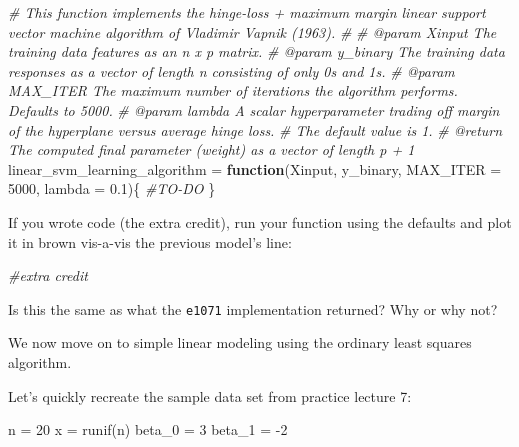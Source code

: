 \documentclass[
]{article}
\newenvironment{Shaded}{\begin{snugshade}}{\end{snugshade}}
\newcommand{\AttributeTok}[1]{\textcolor[rgb]{0.77,0.63,0.00}{#1}}
\newcommand{\CommentTok}[1]{\textcolor[rgb]{0.56,0.35,0.01}{\textit{#1}}}
\newcommand{\ControlFlowTok}[1]{\textcolor[rgb]{0.13,0.29,0.53}{\textbf{#1}}}
\newcommand{\DecValTok}[1]{\textcolor[rgb]{0.00,0.00,0.81}{#1}}
\newcommand{\FloatTok}[1]{\textcolor[rgb]{0.00,0.00,0.81}{#1}}
\newcommand{\FunctionTok}[1]{\textcolor[rgb]{0.00,0.00,0.00}{#1}}
\newcommand{\NormalTok}[1]{#1}
\newcommand{\OtherTok}[1]{\textcolor[rgb]{0.56,0.35,0.01}{#1}}
\newcommand{\SpecialCharTok}[1]{\textcolor[rgb]{0.00,0.00,0.00}{#1}}
\begin{document}
\begin{Shaded}
\begin{Highlighting}[]
\CommentTok{\#\textquotesingle{} This function implements the hinge{-}loss + maximum margin linear support vector machine algorithm of Vladimir Vapnik (1963).}
\CommentTok{\#\textquotesingle{}}
\CommentTok{\#\textquotesingle{} @param Xinput      The training data features as an n x p matrix.}
\CommentTok{\#\textquotesingle{} @param y\_binary    The training data responses as a vector of length n consisting of only 0\textquotesingle{}s and 1\textquotesingle{}s.}
\CommentTok{\#\textquotesingle{} @param MAX\_ITER    The maximum number of iterations the algorithm performs. Defaults to 5000.}
\CommentTok{\#\textquotesingle{} @param lambda      A scalar hyperparameter trading off margin of the hyperplane versus average hinge loss.}
\CommentTok{\#\textquotesingle{}                    The default value is 1.}
\CommentTok{\#\textquotesingle{} @return            The computed final parameter (weight) as a vector of length p + 1}
\NormalTok{linear\_svm\_learning\_algorithm }\OtherTok{=} \ControlFlowTok{function}\NormalTok{(Xinput, y\_binary, }\AttributeTok{MAX\_ITER =} \DecValTok{5000}\NormalTok{, }\AttributeTok{lambda =} \FloatTok{0.1}\NormalTok{)\{}
  \CommentTok{\#TO{-}DO}
\NormalTok{\}}
\end{Highlighting}
\end{Shaded}

If you wrote code (the extra credit), run your function using the
defaults and plot it in brown vis-a-vis the previous model's line:

\begin{Shaded}
\begin{Highlighting}[]
\CommentTok{\#extra credit}
\end{Highlighting}
\end{Shaded}

Is this the same as what the \texttt{e1071} implementation returned? Why
or why not?

We now move on to simple linear modeling using the ordinary least
squares algorithm.

Let's quickly recreate the sample data set from practice lecture 7:

\begin{Shaded}
\begin{Highlighting}[]
\NormalTok{n }\OtherTok{=} \DecValTok{20}
\NormalTok{x }\OtherTok{=} \FunctionTok{runif}\NormalTok{(n)}
\NormalTok{beta\_0 }\OtherTok{=} \DecValTok{3}
\NormalTok{beta\_1 }\OtherTok{=} \SpecialCharTok{{-}}\DecValTok{2}
\end{Highlighting}
\end{Shaded}
\end{document}

